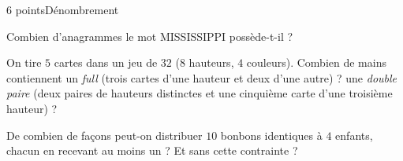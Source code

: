 \begin{exoEval}{6 points}{Dénombrement}
\begin{questions}
  \item Combien d'anagrammes le mot MISSISSIPPI possède-t-il ?
  \item On tire $5$ cartes dans un jeu de $32$ ($8$ hauteurs, $4$
    couleurs). Combien de mains contiennent un \emph{full} (trois cartes
    d'une hauteur et deux d'une autre) ? une \emph{double paire} (deux
    paires de hauteurs distinctes et une cinquième carte d'une troisième
    hauteur) ?
  \item De combien de façons peut-on distribuer $10$ bonbons identiques à
    $4$ enfants, chacun en recevant au moins un ? Et sans cette
    contrainte ?
\end{questions}
\end{exoEval}
